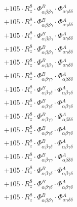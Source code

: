 \documentclass{article}
\begin{document}
\begin{subequations}
\begin{gather}
\begin{array}{c}
 \\[0.2em] 		 + 105 \cdot R_{z}^{8} \cdot \Phi{}^{B}_{\alpha{}\beta{}\beta{}\gamma{}} \cdot \Phi{}^{A}_{\alpha{}\gamma{}\delta{}\delta{}} 
 \\[0.2em] 		 + 105 \cdot R_{z}^{8} \cdot \Phi{}^{B}_{\alpha{}\beta{}\beta{}\gamma{}} \cdot \Phi{}^{A}_{\alpha{}\gamma{}\delta{}\delta{}} 
 \\[0.2em] 		 + 105 \cdot R_{z}^{8} \cdot \Phi{}^{B}_{\alpha{}\beta{}\beta{}\gamma{}} \cdot \Phi{}^{A}_{\alpha{}\gamma{}\delta{}\delta{}} 
 \\[0.2em] 		 + 105 \cdot R_{z}^{8} \cdot \Phi{}^{B}_{\alpha{}\beta{}\beta{}\gamma{}} \cdot \Phi{}^{A}_{\alpha{}\gamma{}\delta{}\delta{}} 
 \\[0.2em] 		 + 105 \cdot R_{z}^{8} \cdot \Phi{}^{B}_{\alpha{}\beta{}\beta{}\gamma{}} \cdot \Phi{}^{A}_{\alpha{}\gamma{}\delta{}\delta{}} 
 \\[0.2em] 		 + 105 \cdot R_{z}^{8} \cdot \Phi{}^{B}_{\alpha{}\beta{}\gamma{}\gamma{}} \cdot \Phi{}^{A}_{\alpha{}\beta{}\delta{}\delta{}} 
 \\[0.2em] 		 + 105 \cdot R_{z}^{8} \cdot \Phi{}^{B}_{\alpha{}\beta{}\gamma{}\delta{}} \cdot \Phi{}^{A}_{\alpha{}\beta{}\gamma{}\delta{}} 
 \\[0.2em] 		 + 105 \cdot R_{z}^{8} \cdot \Phi{}^{B}_{\alpha{}\beta{}\gamma{}\delta{}} \cdot \Phi{}^{A}_{\alpha{}\beta{}\gamma{}\delta{}} 
 \\[0.2em] 		 + 105 \cdot R_{z}^{8} \cdot \Phi{}^{B}_{\alpha{}\beta{}\gamma{}\gamma{}} \cdot \Phi{}^{A}_{\alpha{}\beta{}\delta{}\delta{}} 
 \\[0.2em] 		 + 105 \cdot R_{z}^{8} \cdot \Phi{}^{B}_{\alpha{}\beta{}\gamma{}\delta{}} \cdot \Phi{}^{A}_{\alpha{}\beta{}\gamma{}\delta{}} 
 \\[0.2em] 		 + 105 \cdot R_{z}^{8} \cdot \Phi{}^{B}_{\alpha{}\beta{}\gamma{}\delta{}} \cdot \Phi{}^{A}_{\alpha{}\beta{}\gamma{}\delta{}} 
 \\[0.2em] 		 + 105 \cdot R_{z}^{8} \cdot \Phi{}^{B}_{\alpha{}\beta{}\gamma{}\gamma{}} \cdot \Phi{}^{A}_{\alpha{}\beta{}\delta{}\delta{}} 
 \\[0.2em] 		 + 105 \cdot R_{z}^{8} \cdot \Phi{}^{B}_{\alpha{}\beta{}\gamma{}\delta{}} \cdot \Phi{}^{A}_{\alpha{}\beta{}\gamma{}\delta{}} 
 \\[0.2em] 		 + 105 \cdot R_{z}^{8} \cdot \Phi{}^{B}_{\alpha{}\beta{}\gamma{}\delta{}} \cdot \Phi{}^{A}_{\alpha{}\beta{}\gamma{}\delta{}} 
 \\[0.2em] 		 + 105 \cdot R_{z}^{8} \cdot \Phi{}^{B}_{\alpha{}\beta{}\beta{}\gamma{}} \cdot \Phi{}^{A}_{\alpha{}\gamma{}\delta{}\delta{}} 

\end{array}
\end{gather}
\end{subequations}
\end{document}
